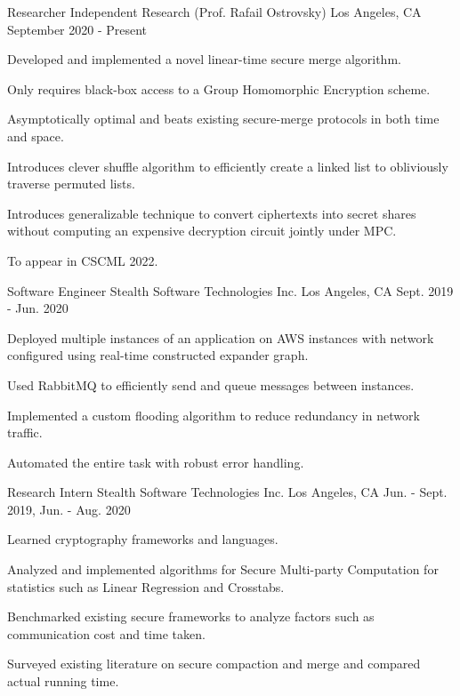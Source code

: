 \begin{cventries}
  \cventry
    {Researcher} %
    {Independent Research (Prof. Rafail Ostrovsky)} %
    {Los Angeles, CA} %
    {September 2020 - Present} %
    {
      \begin{cvitems} %
        \item{Developed and implemented a novel linear-time secure merge algorithm.}
        \item{Only requires black-box access to a Group Homomorphic Encryption scheme.}
        \item{Asymptotically optimal and beats existing secure-merge protocols in both time and space.}
        \item{Introduces clever shuffle algorithm to efficiently create a linked list to obliviously traverse permuted lists.}
        \item{Introduces generalizable technique to convert ciphertexts into secret shares without computing an expensive decryption circuit jointly under MPC.}
        \item{To appear in CSCML 2022.}
      \end{cvitems}
    }

  \cventry
    {Software Engineer} %
    {Stealth Software Technologies Inc.} %
    {Los Angeles, CA} %
    {Sept. 2019 - Jun. 2020} %
    {
      \begin{cvitems} %
        \item{Deployed multiple instances of an application on AWS instances with network configured using real-time constructed expander
graph.}
        \item{Used RabbitMQ to efficiently send and queue messages between instances.}
        \item{Implemented a custom flooding algorithm to reduce redundancy in network traffic.} 
        \item{Automated the entire task with robust error handling.}
      \end{cvitems}
    }
    
\cventry
{Research Intern} %
{Stealth Software Technologies Inc.} %
{Los Angeles, CA} %
{Jun. - Sept. 2019, Jun. - Aug. 2020} %
{
  \begin{cvitems} %
    \item{Learned cryptography frameworks and languages.}
    \item{Analyzed and implemented algorithms for Secure Multi-party Computation for statistics such as Linear Regression and Crosstabs.}
    \item{Benchmarked existing secure frameworks to analyze factors such as communication cost and time taken.}
    \item{Surveyed existing literature on secure compaction and merge and compared actual running time.}
  \end{cvitems}
}

\end{cventries}
